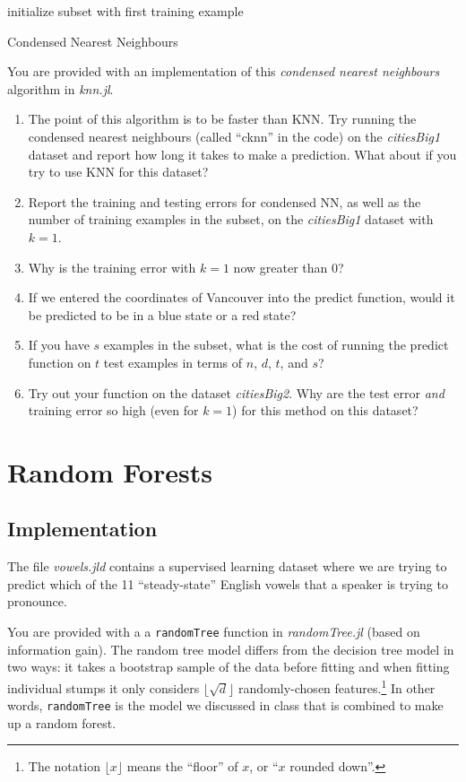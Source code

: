 \documentclass{article}
\def\blu#1{{\color{blu}#1}}
\def\enum#1{\begin{enumerate}#1\end{enumerate}}
\begin{document}
\begin{algorithm}[H]
 initialize subset with first training example\;
 \caption{Condensed Nearest Neighbours}
\end{algorithm}
You are provided with an implementation of this \emph{condensed nearest neighbours} algorithm in \emph{knn.jl}. 
\blu{
\enum{
\item The point of this algorithm is to be faster than KNN. Try running the condensed nearest neighbours (called ``cknn'' in the code) on the \emph{citiesBig1} dataset and report how long it takes to make a prediction. What about if you try to use KNN for this dataset?
\item Report the training and testing errors for condensed NN, as well as the number of training examples in the subset, on the \emph{citiesBig1} dataset with $k=1$.
\item Why is the training error with $k=1$ now greater than $0$?
\item If we entered the coordinates of Vancouver into the predict function, would it be predicted to be in a blue state or a red state?
\item If you have $s$ examples in the subset, what is the cost of running the predict function on $t$ test examples in terms of $n$, $d$, $t$, and $s$?
\item Try out your function on the dataset \emph{citiesBig2}. Why are the  test error \emph{and} training error so high (even for $k=1$) for this method on this dataset?
}
}


\section{Random Forests}

 
 \subsection{Implementation}
 
The file \emph{vowels.jld} contains a supervised learning dataset where we are trying to predict which of the 11 ``steady-state'' English vowels that a speaker is trying to pronounce.

You are provided with a a \texttt{randomTree} function in \emph{randomTree.jl} (based on information gain). The random tree model differs from the decision tree model in two ways: 
it takes a bootstrap sample of the data before fitting and when fitting individual stumps it only considers $\lfloor \sqrt{d} \rfloor$ randomly-chosen features.\footnote{The notation $\lfloor x\rfloor$ means the ``floor'' of $x$, or ``$x$ rounded down''.}  
In other words, \texttt{randomTree} is the model we discussed in class that is combined to make up a random forest.
\end{document}
